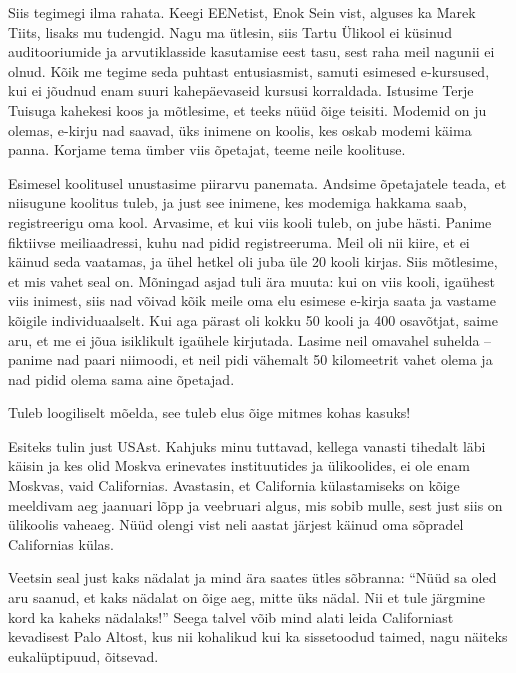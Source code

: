 Siis tegimegi ilma rahata. Keegi EENetist, Enok Sein vist, alguses ka Marek Tiits, lisaks mu 
tudengid. Nagu ma ütlesin, siis Tartu Ülikool ei küsinud 
auditooriumide ja arvutiklasside kasutamise eest tasu, sest raha meil nagunii ei olnud. 
Kõik me tegime seda puhtast entusiasmist, samuti esimesed e-kursused, kui ei jõudnud enam suuri kahepäevaseid kursusi 
korraldada. Istusime Terje Tuisuga kahekesi 
koos ja mõtlesime, et teeks nüüd õige teisiti. Modemid on ju olemas, 
e-kirju nad saavad, üks inimene on koolis, kes oskab modemi käima panna. 
Korjame tema ümber viis õpetajat, teeme neile koolituse. 

Esimesel koolitusel unustasime piirarvu panemata. Andsime õpetajatele teada, et niisugune koolitus 
tuleb, ja just see inimene, kes modemiga hakkama saab, 
registreerigu oma kool. Arvasime, et kui viis kooli tuleb, on jube 
hästi. Panime fiktiivse meiliaadressi, kuhu nad pidid registreeruma. Meil oli nii kiire, et ei käinud seda vaatamas, ja ühel hetkel 
oli juba üle 20 kooli kirjas. Siis mõtlesime, et 
mis vahet seal on. Mõningad asjad tuli ära muuta: kui on viis 
kooli, igaühest viis inimest, siis nad võivad kõik meile oma elu esimese 
e-kirja saata ja vastame kõigile individuaalselt. Kui aga pärast oli kokku 50 kooli 
ja 400 osavõtjat, saime aru, et me ei jõua isiklikult igaühele 
kirjutada. Lasime neil omavahel suhelda -- panime nad 
paari niimoodi, et neil pidi vähemalt 50 kilomeetrit vahet olema ja nad pidid olema sama aine 
õpetajad.


Tuleb loogiliselt mõelda, see tuleb elus õige mitmes 
kohas kasuks! 


Esiteks tulin just USAst. Kahjuks minu tuttavad, 
kellega vanasti tihedalt läbi käisin ja kes olid Moskva erinevates 
instituutides ja ülikoolides, ei ole enam Moskvas, vaid Californias. Avastasin, et California külastamiseks on kõige meeldivam aeg 
jaanuari lõpp ja veebruari algus, mis sobib mulle, sest just siis on ülikoolis 
vaheaeg. Nüüd olengi vist neli aastat järjest käinud oma sõpradel Californias külas. 

Veetsin seal just kaks nädalat 
ja mind ära saates ütles sõbranna: \enquote{Nüüd sa oled aru saanud, et kaks 
nädalat on õige aeg, mitte üks nädal. Nii et tule järgmine kord ka kaheks 
nädalaks!} Seega talvel võib mind alati leida 
Californiast kevadisest Palo Altost, kus nii kohalikud kui ka 
sissetoodud taimed, nagu näiteks eukalüptipuud, õitsevad. 

